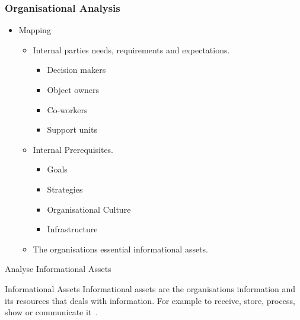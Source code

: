 \documentclass{beamer}
\begin{document}
\subsubsection{Organisational Analysis}
\begin{frame}{\insertsubsubsectionhead}
  \begin{itemize}
    \item Mapping
    \begin{itemize}
      \item Internal parties needs, requirements and expectations.
      \begin{itemize}
        \item Decision makers
        \item Object owners
        \item Co-workers
        \item Support units
      \end{itemize}
      \item Internal Prerequisites.
      \begin{itemize}
        \item Goals
        \item Strategies
        \item Organisational Culture
        \item Infrastructure
      \end{itemize}
      \item The organisations essential informational assets.
    \end{itemize}
  \end{itemize}
\end{frame}

\begin{frame}{Analyse Informational Assets}{\insertsubsubsectionhead}
  \begin{block}{Informational Assets}
    Informational assets are the organisations information and its resources
    that deals with information. For example to receive, store, process, show or
    communicate it~\cite{msb_metodstod}.
  \end{block}
\end{frame}
\end{document}
